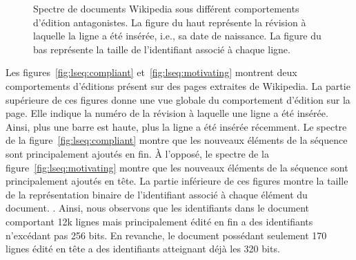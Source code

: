 \begin{figure}
  \centering
  \hspace{10pt}
  \caption{\label{fig:lseq:allocation}Spectre de documents Wikipedia sous différent
    comportements d'édition antagonistes. La figure du haut représente la
    révision à laquelle la ligne a été insérée, i.e., sa date de naissance.  La
    figure du bas représente la taille de l'identifiant associé à chaque ligne.}
\end{figure}

Les figures~\ref{fig:lseq:compliant} et~\ref{fig:lseq:motivating} montrent deux
comportements d'éditions présent sur des pages extraites de Wikipedia. La partie
supérieure de ces figures donne une vue globale du comportement d'édition sur la
page. Elle indique la numéro de la révision à laquelle une ligne a été
insérée. Ainsi, plus une barre est haute, plus la ligne a été insérée
récemment. Le spectre de la figure~\ref{fig:lseq:compliant} montre que les
nouveaux éléments de la séquence sont principalement ajoutés en fin. À l'opposé,
le spectre de la figure~\ref{fig:lseq:motivating} montre que les nouveaux
éléments de la séquence sont principalement ajoutés en tête. La partie
inférieure de ces figures montre la taille de la représentation binaire de
l'identifiant associé à chaque élément du document. . Ainsi, nous observons que les identifiants dans le document
comportant 12k lignes mais principalement édité en fin a des identifiants
n'excédant pas 256 bits. En revanche, le document possédant seulement 170 lignes
édité en tête a des identifiants atteignant déjà les 320 bits.


